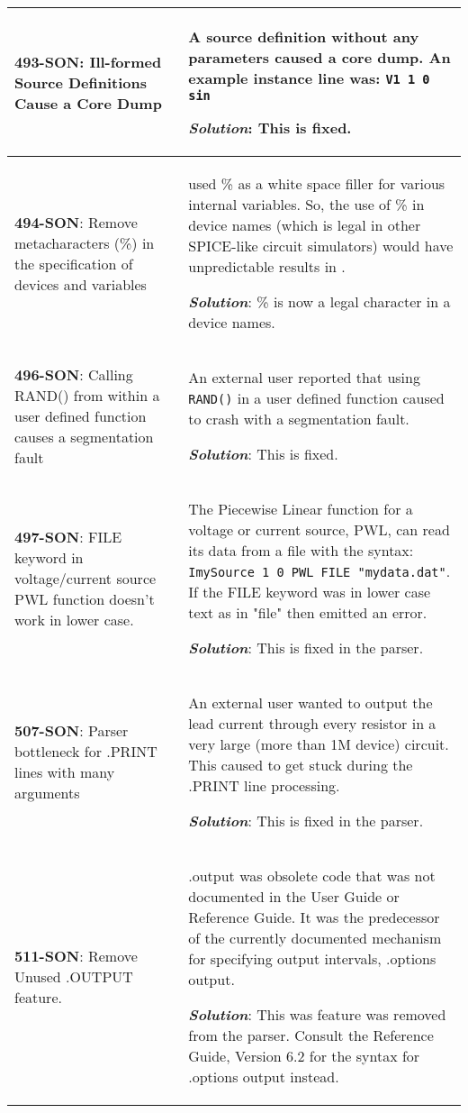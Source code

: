 \begin{longtable}[h] {>{\raggedright\small}m{2in}|>{\raggedright\let\\\tabularnewline\small}m{3.5in}}
\textbf{493-SON}: Ill-formed Source Definitions Cause a Core Dump & A source
definition without any parameters caused a core dump.  An example instance
line was: \texttt{V1 1 0 sin}

\textbf{\textit{Solution}}: This is fixed.
\\ \hline

\textbf{494-SON}: Remove metacharacters (\%) in the specification of 
devices and variables & \Xyce{} used \% as a white space filler for various
internal variables.  So, the use of \% in device names (which is legal in
other SPICE-like circuit simulators) would have unpredictable results in
\Xyce{}.

\textbf{\textit{Solution}}: \% is now a legal character in a \Xyce{} device
names.
\\ \hline

\textbf{496-SON}: Calling RAND() from within a user defined function causes a 
segmentation fault & An external user reported that using \texttt{RAND()} in
a user defined function caused \Xyce{} to crash with a segmentation fault. 

\textbf{\textit{Solution}}: This is fixed.
\\ \hline

\textbf{497-SON}: FILE keyword in voltage/current source PWL function doesn't
work in lower case. &  The Piecewise Linear function for a voltage or current
source, PWL, can read its data from a file with the syntax: \texttt{ImySource
 1 0 PWL FILE "mydata.dat"}.  If the FILE keyword was in lower case text as in
"file" then \Xyce{} emitted an error.

\textbf{\textit{Solution}}: This is fixed in the parser.
\\ \hline 

\textbf{507-SON}: Parser bottleneck for .PRINT lines with many arguments &
An external user wanted to output the lead current through every resistor in
a very large (more than 1M device) circuit. This caused \Xyce{} to get
stuck during the .PRINT line processing.  

\textbf{\textit{Solution}}: This is fixed in the parser. 
\\ \hline

\textbf{511-SON}: Remove Unused .OUTPUT feature. &  .output was obsolete code
that was not documented in the \Xyce{} User Guide or Reference Guide.  It
was the predecessor of the currently documented mechanism for specifying
output intervals, .options output. 

\textbf{\textit{Solution}}: This was feature was removed from the parser.  
Consult the \Xyce{} Reference Guide, Version 6.2 for the syntax for .options
output instead.
\\ \hline 


\end{longtable}
